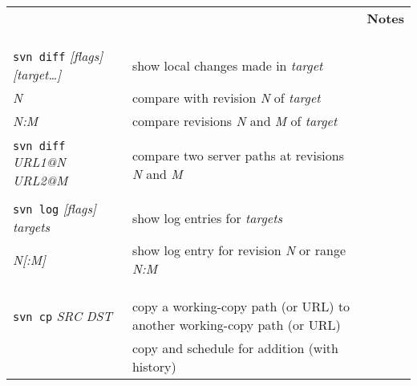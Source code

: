 \documentclass{report}
\begin{document}
\newpage
\hspace{-0.7in}
\begin{tabular}{lp{3in}p{2in}}

& & \multicolumn{1}{c}{\bf\Large Notes}             \\ \cline{3-3}

\\
\\
\vspace{0.1in} \hspace{-0.1in}{\bf\Large Examining History} & \\

{\tt svn diff} {\sl [flags]} {\sl [target\dots]}  &
show local changes made in {\sl target}		&  \\

\hspace{0.5in}{\tt -r} {\sl N}		&
compare with revision {\sl N} of {\sl target} 	& \\

\hspace{0.5in}{\tt -r} {\sl N:M}		&
compare revisions {\sl N} and {\sl M} of {\sl target} 	& \\

\\
{\tt svn diff} {\sl URL1@N} {\sl URL2@M}  &
compare two server paths at revisions {\sl N} and {\sl M}	&  \\

\\
{\tt svn log} {\sl [flags]} {\sl targets}		&
show log entries for {\sl targets}			& \\

\hspace{0.5in}{\tt -r} {\sl N[:M]}		&
show log entry for revision {\sl N} or range {\sl N:M} & \\

\\
\\
\vspace{0.1in} \hspace{-0.1in}{\bf\Large Branches and Tags} & \\

{\tt svn cp} {\sl SRC} {\sl DST}		&
copy a working-copy path (or URL) to another working-copy path (or URL) & \\

\hspace{0.5in}{\tt WC => WC}		&
copy and schedule for addition (with history) & \\


\end{tabular}
\end{document}
